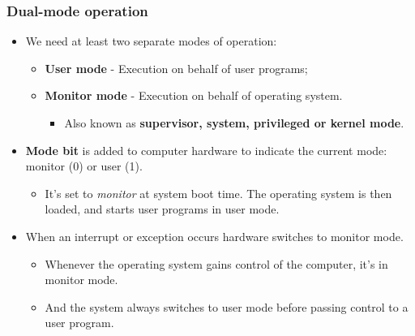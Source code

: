 \documentclass[CJKutf8,xcolor=pdftex,dvipsnames,table]{beamer}
\begin{document}
\begin{CJK*}{UTF8}{song}
  \begin{frame}
    \frametitle{Dual-mode operation} \pause
    \begin{itemize}
    \item{We need at least two separate modes of operation:} \pause
      \begin{itemize}
      \item{\textbf{User mode} \pause - Execution on behalf of user programs;} \pause
      \item{\textbf{Monitor mode} \pause - Execution on behalf of operating system.} \pause
        \begin{itemize}
        \item{Also known as \textbf{supervisor, system, privileged or kernel mode}.} \pause
        \end{itemize}
      \end{itemize}
    \item{\textbf{Mode bit} is added to computer hardware to indicate the current mode:  monitor (0) or user (1).} \pause
      \begin{itemize}
      \item{It's set to \emph{monitor} at system boot time. \pause The operating system is then loaded, and starts user programs in user mode.} \pause
      \end{itemize}
    \item{When an interrupt or exception occurs hardware switches to monitor mode.} \pause
      \begin{itemize}
      \item{Whenever the operating system gains control of the computer, it's in monitor mode.} \pause
      \item{And the system always switches to user mode before passing control to a user program.}
      \end{itemize}
    \end{itemize}
  \end{frame}


\end{CJK*}
\end{document}
